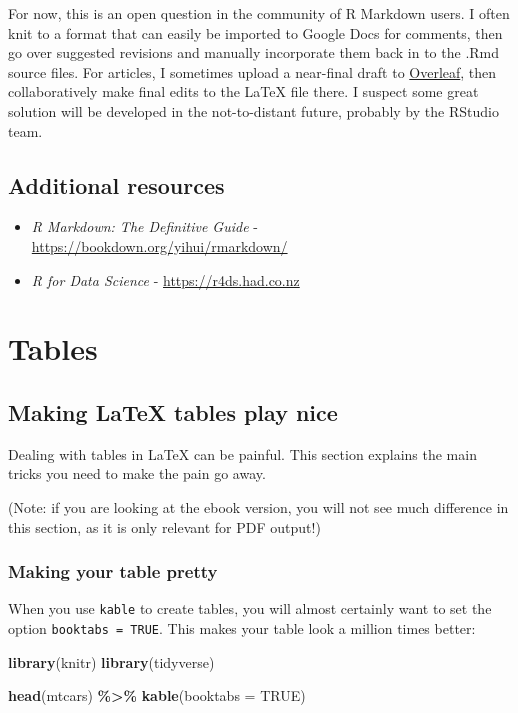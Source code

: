 \documentclass[a4paper, nobind]{templates/ociamthesis}
\newenvironment{Shaded}{\begin{snugshade}}{\end{snugshade}}
\newcommand{\AttributeTok}[1]{\textcolor[rgb]{0.13,0.29,0.53}{#1}}
\newcommand{\ConstantTok}[1]{\textcolor[rgb]{0.56,0.35,0.01}{#1}}
\newcommand{\FunctionTok}[1]{\textcolor[rgb]{0.13,0.29,0.53}{\textbf{#1}}}
\newcommand{\NormalTok}[1]{#1}
\newcommand{\SpecialCharTok}[1]{\textcolor[rgb]{0.81,0.36,0.00}{\textbf{#1}}}
\renewenvironment{Shaded}
{
  \vspace{10pt}%
  \begin{snugshade}%
}{%
  \end{snugshade}%
  \vspace{8pt}%
}
\begin{document}
For now, this is an open question in the community of R Markdown users.
I often knit to a format that can easily be imported to Google Docs for comments, then go over suggested revisions and manually incorporate them back in to the .Rmd source files.
For articles, I sometimes upload a near-final draft to \href{https://www.overleaf.com/}{Overleaf}, then collaboratively make final edits to the LaTeX file there.
I suspect some great solution will be developed in the not-to-distant future, probably by the RStudio team.

\section{Additional resources}\label{additional-resources}

\begin{itemize}
\item
  \emph{R Markdown: The Definitive Guide} - \url{https://bookdown.org/yihui/rmarkdown/}
\item
  \emph{R for Data Science} - \url{https://r4ds.had.co.nz}
\end{itemize}

\chapter{Tables}\label{tables}

\minitoc 

\section{Making LaTeX tables play nice}\label{making-latex-tables-play-nice}

Dealing with tables in LaTeX can be painful.
This section explains the main tricks you need to make the pain go away.

(Note: if you are looking at the ebook version, you will not see much difference in this section, as it is only relevant for PDF output!)

\subsection{Making your table pretty}\label{making-your-table-pretty}

When you use \texttt{kable} to create tables, you will almost certainly want to set the option \texttt{booktabs\ =\ TRUE}.
This makes your table look a million times better:

\begin{Shaded}
\begin{Highlighting}[]
\FunctionTok{library}\NormalTok{(knitr)}
\FunctionTok{library}\NormalTok{(tidyverse)}

\FunctionTok{head}\NormalTok{(mtcars) }\SpecialCharTok{\%\textgreater{}\%} 
  \FunctionTok{kable}\NormalTok{(}\AttributeTok{booktabs =} \ConstantTok{TRUE}\NormalTok{)}
\end{Highlighting}
\end{Shaded}
\end{document}
